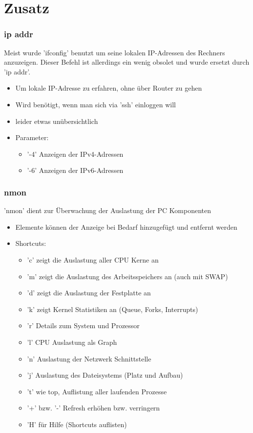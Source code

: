 \documentclass[12pt,utf8, handout]{beamer}
\begin{document}
\section{Zusatz}
\begin{frame}
\frametitle{ip addr}
Meist wurde 'ifconfig' benutzt um seine lokalen IP-Adressen des Rechners anzuzeigen. Dieser Befehl ist allerdings ein wenig obsolet und wurde ersetzt durch 'ip addr'.
\begin{itemize}
	\item Um lokale IP-Adresse zu erfahren, ohne über Router zu gehen
	\item Wird benötigt, wenn man sich via 'ssh' einloggen will
	\item leider etwas unübersichtlich
	\item Parameter:
	\begin{itemize}
		\item '-4' Anzeigen der IPv4-Adressen
		\item '-6' Anzeigen der IPv6-Adressen
	\end{itemize}
\end{itemize}
\end{frame}

\begin{frame}
\frametitle{nmon}
'nmon' dient zur Überwachung der Auslastung der PC Komponenten
\begin{itemize}
	\item Elemente können der Anzeige bei Bedarf hinzugefügt und entfernt werden
	\item Shortcuts:
	\begin{itemize}[<+->]
		\item 'c' zeigt die Auslastung aller CPU Kerne an
		\item 'm' zeigt die Auslastung des Arbeitsspeichers an (auch mit SWAP)
		\item 'd' zeigt die Auslastung der Festplatte an
		\item 'k' zeigt Kernel Statistiken an (Queue, Forks, Interrupts)
		\item 'r' Details zum System und Prozessor
		\item 'l' CPU Auslastung als Graph
		\item 'n' Auslastung der Netzwerk Schnittstelle
		\item 'j' Auslastung des Dateisystems (Platz und Aufbau)
		\item 't' wie top, Auflistung aller laufenden Prozesse
		\item '+' bzw. '-' Refresh erhöhen bzw. verringern
		\item 'H' für Hilfe (Shortcuts auflisten)
	\end{itemize}
\end{itemize}
\end{frame}
\end{document}
